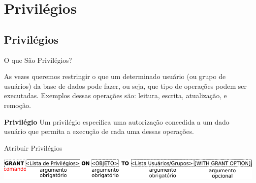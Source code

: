 \documentclass[xcolor=x11names,compress]{beamer}
\begin{document}
\section{Privilégios}
\subsection{Privilégios}

\begin{frame}{O que São Privilégios?}

As vezes queremos restringir o que um determinado usuário (ou grupo de usuários) da base de dados pode fazer, ou seja, que tipo de operações podem ser executadas. Exemplos dessas operações são: leitura, escrita, atualização, e remoção.

\pause 

\begin{alertblock}{\centering \textbf{Privilégio}}
Um privilégio especifica uma autorização concedida a um dado usuário que permita a execução de cada uma dessas operações.
\end{alertblock}
\end{frame}

\begin{frame}{Atribuir Privilégios}

\centering \includegraphics[keepaspectratio,width=\textwidth]{grant}

\end{frame}
\end{document}
